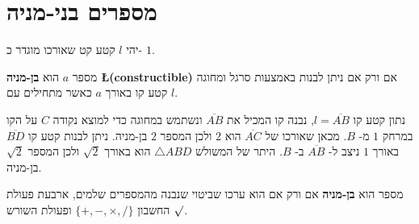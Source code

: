 \section{מספרים בני-מניה}\label{s.trisect-constructible}

יהי 
$l$
קטע קט שאורכו מוגדר כ-%
$1$.
\begin{definition}
מספר
$a$
הוא
\textbf{בן-מניה \L{(constructible)}}
אם ורק אם ניתן לבנות באמצעות סרגל ומחוגה קטע קו באורך
$a$
כאשר מתחילים עם
$l$.
\end{definition}
נתון קטע קו
$l=\overline{AB}$,
נבנה קו המכיל את
$\overline{AB}$
ונשתמש במחוגה כדי למוצא נקודה
$C$
על הקו במרחק
$1$
מ-%
$B$.
מכאן שאורכו של
$\overline{AC}$
הוא
$2$
ולכן המספר
$2$
בן-מניה. ניתן לבנות קטע קו
$\overline{BD}$
באורך
$1$
ניצב ל-%
$\overline{AB}$
ב-%
$B$.
היתר של המשולש
$\triangle ABD$
הוא באורך
$\sqrt{2}$
ולכן המספר
$\sqrt{2}$
בן-מניה.

\begin{theorem}\label{thm.trisect-constructible}
מספר הוא
\textbf{בן-מניה}
אם ורק אם הוא ערכו שביטוי שנבנה מהמספרים שלמים, ארבעת פעולת החשבון
$\{+,-,\times,/\}$
ופעולת השורש
$\surd$.
\end{theorem}

